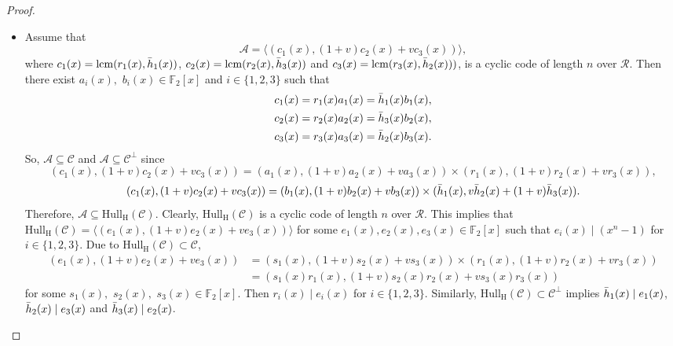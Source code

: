 \documentclass[pdflatex,sn-mathphys-num]{sn-jnl}%
\theoremstyle{thmstyleone}%
\theoremstyle{thmstyletwo}%
\theoremstyle{thmstylethree}%
\begin{document}
\begin{proof}
\begin{itemize}
\item[(i)] Assume that
\begin{equation*}
\mathcal{A}=\langle (c_{1}(x),(1+v)c_{2}(x)+vc_{3}(x))\rangle ,
\end{equation*}
where $c_{1}(x)=\mathrm{lcm}(r_{1}(x),\Bar{h}_{1}(x))$, $c_{2}(x)=\mathrm{lcm}(r_{2}(x),\Bar{h}_{3}(x))$ and $c_{3}(x)=\mathrm{lcm}(r_{3}(x),\Bar{h}_{2}(x)))$, is a cyclic code of length $n$ over $\mathcal{R}$. Then  there exist $a_{i}(x),$ $b_{i}(x)\in \mathbb{F}_{2}[x]$ and $i\in \{1,2,3\}$ such that
\begin{align*}
c_{1}(x)& =r_{1}(x)a_{1}(x)=\Bar{h}_{1}(x)b_{1}(x), \\
c_{2}(x)& =r_{2}(x)a_{2}(x)=\Bar{h}_{3}(x)b_{2}(x), \\
c_{3}(x)& =r_{3}(x)a_{3}(x)=\Bar{h}_{2}(x)b_{3}(x).
\end{align*}
So, $\mathcal{A}\subseteq \mathcal{C}$ and $\mathcal{A}\subseteq \mathcal{C}^{\perp }$ since
\begin{equation*}
(c_{1}(x),(1+v)c_{2}(x)+vc_{3}(x))=(a_{1}(x),(1+v)a_{2}(x)+va_{3}(x))\times
(r_{1}(x),(1+v)r_{2}(x)+vr_{3}(x)),
\end{equation*}
\begin{equation*}
(c_{1}(x),(1+v)c_{2}(x)+vc_{3}(x))=(b_{1}(x),(1+v)b_{2}(x)+vb_{3}(x))\times (\Bar{h}_{1}(x),v\Bar{h}_{2}(x)+(1+v)\Bar{h}_{3}(x)).
\end{equation*}
Therefore, $\mathcal{A}\subseteq \mathrm{Hull_{H}}(\mathcal{C})$. Clearly, $\mathrm{Hull_{H}}(\mathcal{C})$ is a cyclic code of length $n$ over $%
\mathcal{R}$. This implies that $\mathrm{Hull_{H}}(\mathcal{C})=\langle
(e_{1}(x),(1+v)e_{2}(x)+ve_{3}(x))\rangle $ for some $e_{1}(x),e_{2}(x),e_{3}(x)\in \mathbb{F}_{2}[x]$ such that $e_{i}(x)\mid
(x^{n}-1)$ for $i\in \{1,2,3\}$. Due to $\mathrm{Hull_{H}}(\mathcal{C}%
)\subset \mathcal{C}$,
\begin{align*}
(e_{1}(x),(1+v)e_{2}(x)+ve_{3}(x))&
=(s_{1}(x),(1+v)s_{2}(x)+vs_{3}(x))\times (r_{1}(x),(1+v)r_{2}(x)+vr_{3}(x))
\\
& =(s_{1}(x)r_{1}(x),(1+v)s_{2}(x)r_{2}(x)+vs_{3}(x)r_{3}(x))
\end{align*}
for some $s_{1}(x),$ $s_{2}(x),$ $s_{3}(x)\in \mathbb{F}_{2}[x]$. Then $%
r_{i}(x)\mid e_{i}(x)$ for $i\in \{1,2,3\}$. Similarly, $\mathrm{Hull_{H}}(%
\mathcal{C})\subset \mathcal{C}^{\perp }$ implies $\Bar{h}_{1}(x)\mid
e_{1}(x)$, $\Bar{h}_{2}(x)\mid e_{3}(x)$ and $\Bar{h}_{3}(x)\mid e_{2}(x)$.

\end{itemize}
\end{proof}
\end{document}
